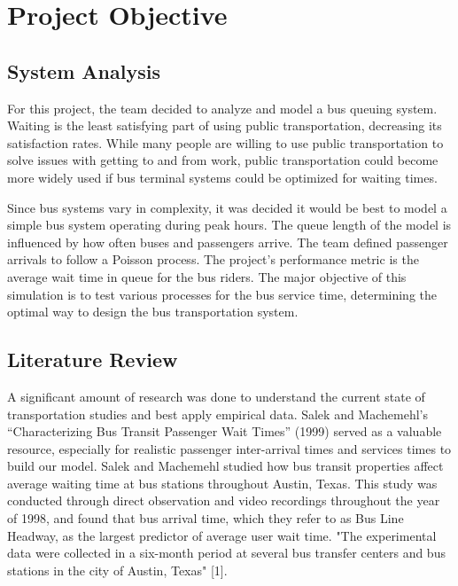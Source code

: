 \documentclass{article}
\begin{document}

\tableofcontents
\newpage

\section{Project Objective}
\subsection{System Analysis}
For this project, the team decided to analyze and model a bus queuing system. Waiting is the least satisfying part of using public transportation, decreasing its satisfaction rates. While many people are willing to use public transportation to solve issues with getting to and from work, public transportation could become more widely used if bus terminal systems could be optimized for waiting times. 

Since bus systems vary in complexity, it was decided it would be best to model a simple bus system operating during peak hours. The queue length of the model is influenced by how often buses and passengers arrive. The team defined passenger arrivals to follow a Poisson process. The project’s performance metric is the average wait time in queue for the bus riders. The major objective of this simulation is to test various processes for the bus service time, determining the optimal way to design the bus transportation system. 

\subsection{Literature Review}
A significant amount of research was done to understand the current state of transportation studies and best apply empirical data. Salek and Machemehl’s “Characterizing Bus Transit Passenger Wait Times” (1999) served as a valuable resource, especially for realistic passenger inter-arrival times and services times to build our model. Salek and Machemehl studied how bus transit properties affect average waiting time at bus stations throughout Austin, Texas. This study was conducted through direct observation and video recordings throughout the year of 1998, and found that bus arrival time, which they refer to as Bus Line Headway, as the largest predictor of average user wait time. "The experimental data were collected in a six-month period at several bus transfer centers and bus stations in the city of Austin, Texas" [1].
\end{document}
